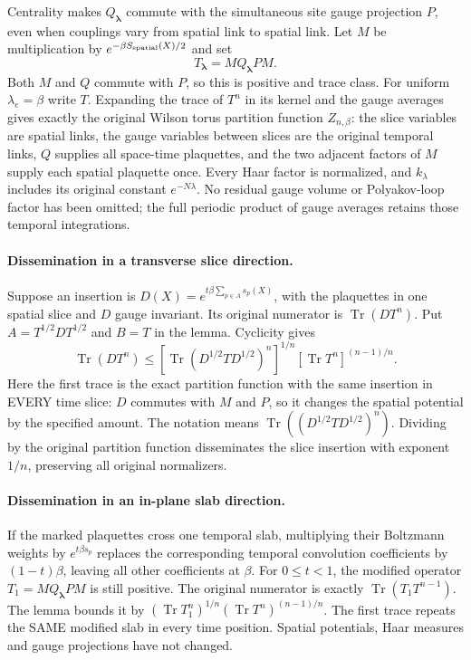 \documentclass[11pt]{article}
\newcommand{\Tr}{\operatorname{Tr}}
\begin{document}
Centrality makes $Q_{\boldsymbol\lambda}$ commute with the simultaneous site gauge
projection $P$, even when couplings vary from spatial link to spatial link.
Let $M$ be multiplication by $e^{-\beta S_{\rm spatial}(X)/2}$ and set
\[
 T_{\boldsymbol\lambda}=M Q_{\boldsymbol\lambda}P M.
\]
Both $M$ and $Q$ commute with $P$, so this is positive and trace class.
For uniform $\lambda_e=\beta$ write $T$.
Expanding the trace of $T^n$ in its kernel and the gauge averages gives exactly the original
Wilson torus partition function $Z_{n,\beta}$: the slice variables are spatial links,
the gauge variables between slices are the original temporal links, $Q$ supplies all
space-time plaquettes, and the two adjacent factors of $M$ supply each spatial plaquette
once. Every Haar factor is normalized, and $k_\lambda$ includes its original constant
$e^{-N\lambda}$. No residual gauge volume or Polyakov-loop factor has been omitted;
the full periodic product of gauge averages retains those temporal integrations.

\paragraph{Dissemination in a transverse slice direction.}
Suppose an insertion is $D(X)=e^{t\beta\sum_{p\in A}s_p(X)}$, with the plaquettes in
one spatial slice and $D$ gauge invariant. Its original numerator is $\Tr(DT^n)$.
Put $A=T^{1/2}DT^{1/2}$ and $B=T$ in the lemma. Cyclicity gives
\[
 \Tr(DT^n)\le[\Tr(D^{1/2}TD^{1/2})^n]^{1/n}[\Tr T^n]^{(n-1)/n}.
\]
Here the first trace is the exact partition function with the same insertion in EVERY
time slice: $D$ commutes with $M$ and $P$, so it changes the spatial potential by the
specified amount. The notation means $\Tr((D^{1/2}TD^{1/2})^n)$.
Dividing by the original partition function disseminates the slice insertion with exponent
$1/n$, preserving all original normalizers.

\paragraph{Dissemination in an in-plane slab direction.}
If the marked plaquettes cross one temporal slab, multiplying their Boltzmann weights by
$e^{t\beta s_p}$ replaces the corresponding temporal convolution coefficients by
$(1-t)\beta$, leaving all other coefficients at $\beta$.
For $0\le t<1$, the modified operator $T_1=M Q_{\boldsymbol\lambda}PM$ is still positive.
The original numerator is exactly $\Tr(T_1T^{n-1})$.
The lemma bounds it by $(\Tr T_1^n)^{1/n}(\Tr T^n)^{(n-1)/n}$.
The first trace repeats the SAME modified slab in every time position. Spatial potentials,
Haar measures and gauge projections have not changed.
\end{document}
